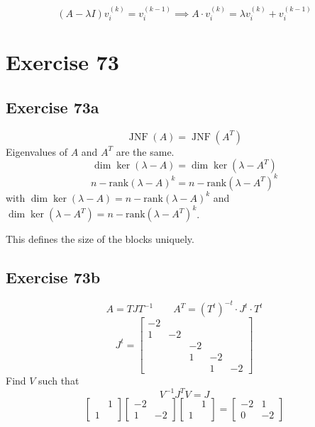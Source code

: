 \documentclass[a4paper]{article}
\theoremstyle{definition}
\begin{document}
\[ (A - \lambda I) v_i^{(k)} = v_i^{(k-1)} \implies A \cdot v_i^{(k)} = \lambda v_i^{(k)} + v_i^{(k-1)} \]

\section{Exercise 73}
\subsection{Exercise 73a}
\[ \operatorname{JNF}(A) = \operatorname{JNF}(A^T) \]
Eigenvalues of $A$ and $A^T$ are the same.
\[ \dim\ker(\lambda - A) = \dim\ker(\lambda - A^T) \]
\[ n-\text{rank}(\lambda - A)^k = n-\text{rank}(\lambda - A^T)^k \]
with $\dim\ker(\lambda - A) = n-\text{rank}(\lambda - A)^k$ and $\dim\ker(\lambda - A^T) = n-\text{rank}(\lambda - A^T)^k$.

This defines the size of the blocks uniquely.

\subsection{Exercise 73b}
\[ A = TJT^{-1} \qquad A^T = (T^t)^{-t} \cdot J^t \cdot T^t \]
\[ J^t = \begin{bmatrix}
    -2 &    &    &    & \\
    1  & -2 &    &    & \\
       &    & -2 &    & \\
       &    &  1 & -2 & \\
       &    &    &  1 & -2
  \end{bmatrix}
\]
Find $V$ such that
\[ V^{-1} J^T V = J \]
\[
  \begin{bmatrix} & 1 \\ 1 & \end{bmatrix}
  \begin{bmatrix} -2 &   \\ 1 & -2 \end{bmatrix}
  \begin{bmatrix} & 1 \\ 1 & \end{bmatrix}
  = \begin{bmatrix} -2 & 1 \\ 0 & -2 \end{bmatrix}
\]
\end{document}
